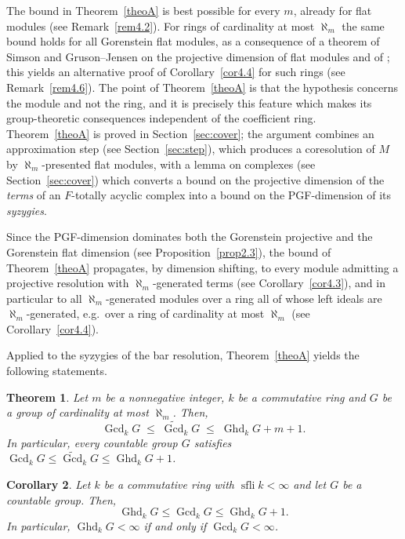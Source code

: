 \documentclass[12pt]{amsart}
\theoremstyle{remark}
\theoremstyle{definition}
\theoremstyle{plain}
\newtheorem{introtheorem}{Theorem}
\newtheorem{introcorollary}[introtheorem]{Corollary}
\DeclareMathOperator{\Ghd}{Ghd}
\DeclareMathOperator{\Gcd}{Gcd}
\DeclareMathOperator{\sfli}{sfli}
\newcommand{\PGFcd}{\widetilde{\Gcd}}
\newcommand{\alephm}{\aleph_m}
\begin{document}
The bound in Theorem~\ref{theoA} is best possible for every $m$, already for flat modules (see Remark~\ref{rem4.2}). For rings of cardinality at most $\alephm$ the same bound holds for all Gorenstein flat modules, as a consequence of a theorem of Simson \cite{Simson} and Gruson--Jensen \cite{GJ} on the projective dimension of flat modules and of \cite[Proposition~15]{DE}; this yields an alternative proof of Corollary~\ref{cor4.4} for such rings (see Remark~\ref{rem4.6}). The point of Theorem~\ref{theoA} is that the hypothesis concerns the module and not the ring, and it is precisely this feature which makes its group-theoretic consequences independent of the coefficient ring. Theorem~\ref{theoA} is proved in Section~\ref{sec:cover}; the argument combines an approximation step (see Section~\ref{sec:step}), which produces a coresolution of $M$ by $\alephm$-presented flat modules, with a lemma on complexes (see Section~\ref{sec:cover}) which converts a bound on the projective dimension of the \emph{terms} of an $F$-totally acyclic complex into a bound on the PGF-dimension of its \emph{syzygies}.

Since the PGF-dimension dominates both the Gorenstein projective and the Gorenstein flat dimension (see Proposition~\ref{prop2.3}), the bound of Theorem~\ref{theoA} propagates, by dimension shifting, to every module admitting a projective resolution with $\alephm$-generated terms (see Corollary~\ref{cor4.3}), and in particular to all $\alephm$-generated modules over a ring all of whose left ideals are $\alephm$-generated, e.g.\ over a ring of cardinality at most $\alephm$ (see Corollary~\ref{cor4.4}).

Applied to the syzygies of the bar resolution, Theorem~\ref{theoA} yields the following statements.

\begin{introtheorem}\label{theoB}
Let $m$ be a nonnegative integer, $k$ be a commutative ring and $G$ be a group of cardinality at most $\alephm$. Then,
\[
\Gcd_kG\;\le\;\PGFcd_kG\;\le\;\Ghd_kG+m+1 .
\]
In particular, every countable group $G$ satisfies $\Gcd_kG\le\PGFcd_kG\le \Ghd_kG+1$.
\end{introtheorem}

\begin{introcorollary}\label{corC}
Let $k$ be a commutative ring with $\sfli k<\infty$ and let $G$ be a countable group. Then,
\[
\Ghd_kG\le\Gcd_kG\le\Ghd_kG+1.
\]
In particular, $\Ghd_kG<\infty$ if and only if $\Gcd_kG<\infty$.
\end{introcorollary}
\end{document}
